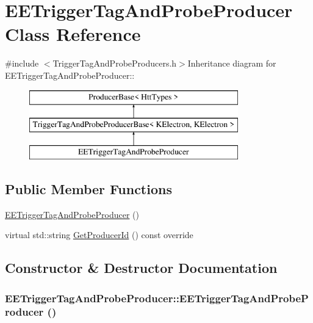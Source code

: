 \hypertarget{classEETriggerTagAndProbeProducer}{
\section{EETriggerTagAndProbeProducer Class Reference}
\label{classEETriggerTagAndProbeProducer}
}


{\ttfamily \#include $<$TriggerTagAndProbeProducers.h$>$}Inheritance diagram for EETriggerTagAndProbeProducer::\begin{figure}[H]
\begin{center}
\leavevmode
\includegraphics[height=3cm]{classEETriggerTagAndProbeProducer}
\end{center}
\end{figure}
\subsection*{Public Member Functions}
\begin{DoxyCompactItemize}
\item 
\hyperlink{classEETriggerTagAndProbeProducer_abdcd699210c65498349c96ccd4e70adb}{EETriggerTagAndProbeProducer} ()
\item 
virtual std::string \hyperlink{classEETriggerTagAndProbeProducer_a57b0a6e9d0e859429865c17a679edd41}{GetProducerId} () const override
\end{DoxyCompactItemize}


\subsection{Constructor \& Destructor Documentation}
\hypertarget{classEETriggerTagAndProbeProducer_abdcd699210c65498349c96ccd4e70adb}{
\subsubsection[{EETriggerTagAndProbeProducer}]{\setlength{\rightskip}{0pt plus 5cm}EETriggerTagAndProbeProducer::EETriggerTagAndProbeProducer ()}}
\label{classEETriggerTagAndProbeProducer_abdcd699210c65498349c96ccd4e70adb}


